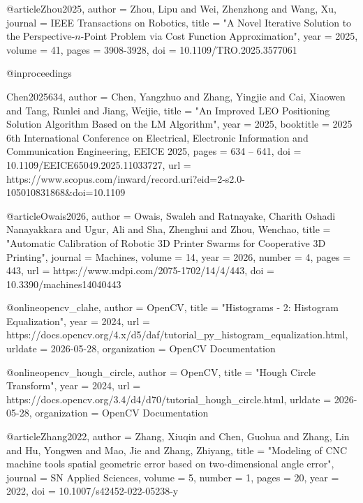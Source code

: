 {{{@article{Zhou2025,
	author    = {Zhou, Lipu and Wei, Zhenzhong and Wang, Xu},
	journal   = {IEEE Transactions on Robotics}, 
	title     = "{A Novel Iterative Solution to the Perspective-$n$-Point Problem via Cost Function Approximation}", 
	year      = {2025},
	volume    = {41},
	pages     = {3908-3928},
	doi       = {10.1109/TRO.2025.3577061}
}

@inproceedings{Chen2025634,
	author       = {Chen, Yangzhuo and Zhang, Yingjie and Cai, Xiaowen and Tang, Runlei and Jiang, Weijie},
	title        = "{An Improved LEO Positioning Solution Algorithm Based on the LM Algorithm}",
	year         = {2025},
	booktitle    = {2025 6th International Conference on Electrical, Electronic Information and Communication Engineering, EEICE 2025},
	pages        = {634 – 641},
	doi          = {10.1109/EEICE65049.2025.11033727},
	url          = {https://www.scopus.com/inward/record.uri?eid=2-s2.0-105010831868&doi=10.1109%
}

@article{Owais2026,
	author    = {Owais, Swaleh and Ratnayake, Charith Oshadi Nanayakkara and Ugur, Ali and Sha, Zhenghui and Zhou, Wenchao},
	title     = "{Automatic Calibration of Robotic 3D Printer Swarms for Cooperative 3D Printing}",
	journal   = {Machines},
	volume    = {14},
	year      = {2026},
	number    = {4},
	pages     = {443},
	url       = {https://www.mdpi.com/2075-1702/14/4/443},
	doi       = {10.3390/machines14040443}
}

@online{opencv_clahe,
	author       = {{OpenCV}},
	title        = "{Histograms - 2: Histogram Equalization}",
	year         = {2024},
	url          = {https://docs.opencv.org/4.x/d5/daf/tutorial_py_histogram_equalization.html},
	urldate      = {2026-05-28},
	organization = {OpenCV Documentation}
}

@online{opencv_hough_circle,
	author       = {{OpenCV}},
	title        = "{Hough Circle Transform}",
	year         = {2024},
	url          = {https://docs.opencv.org/3.4/d4/d70/tutorial_hough_circle.html},
	urldate      = {2026-05-28},
	organization = {OpenCV Documentation}
}

@article{Zhang2022,
	author    = {Zhang, Xiuqin and Chen, Guohua and Zhang, Lin and Hu, Yongwen and Mao, Jie and Zhang, Zhiyang},
	title     = "{Modeling of CNC machine tools spatial geometric error based on two-dimensional angle error}",
	journal   = {SN Applied Sciences},
	volume    = {5},
	number    = {1},
	pages     = {20},
	year      = {2022},
	doi       = {10.1007/s42452-022-05238-y}
}

}}}}
